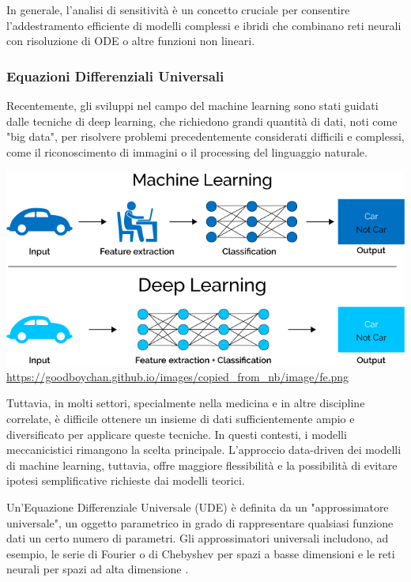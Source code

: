 In generale, l'analisi di sensitività è un concetto cruciale per 
consentire l'addestramento efficiente di modelli complessi e ibridi 
che combinano reti neurali con risoluzione di ODE o altre funzioni non 
lineari.

\subsubsection{Equazioni Differenziali Universali}

Recentemente, gli sviluppi nel campo del machine learning sono stati 
guidati dalle tecniche di deep learning, che richiedono grandi quantità 
di dati, noti come "big data", per risolvere problemi precedentemente 
considerati difficili e complessi, come il riconoscimento di immagini o 
il processing del linguaggio naturale.

\begin{minipage}{\linewidth}
    \centering
    \includegraphics[width=\textwidth]{img/Caratteristiche-e-funzionamento-del-Deep-Learning-in-informatica.png}
    \url{https://goodboychan.github.io/images/copied_from_nb/image/fe.png}
    \label{fig:ml_dl_example}
\end{minipage}

Tuttavia, in molti settori, specialmente nella medicina e in altre 
discipline correlate, è difficile ottenere un insieme di dati 
sufficientemente ampio e diversificato per applicare queste tecniche. 
In questi contesti, i modelli meccanicistici rimangono la scelta 
principale. L'approccio data-driven dei modelli di machine learning, 
tuttavia, offre maggiore flessibilità e la possibilità di evitare 
ipotesi semplificative richieste dai modelli teorici.

Un'Equazione Differenziale Universale (UDE) è definita da un 
"approssimatore universale", un oggetto parametrico in grado di 
rappresentare qualsiasi funzione dati un certo numero di parametri. 
Gli approssimatori universali includono, ad esempio, le serie di Fourier 
o di Chebyshev per spazi a basse dimensioni e le reti neurali per spazi 
ad alta dimensione \cite{rackauckas2020universal}.

